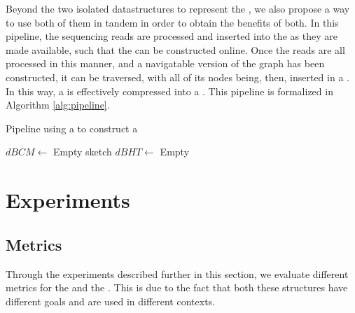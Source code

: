 Beyond the two isolated datastructures to represent the \dBG, we also propose a way to use both of them in tandem in order to obtain
the benefits of both. In this pipeline, the sequencing reads are processed and inserted into the \dBCM as they are made available,
such that the \dBG can be constructed online. Once the reads are all processed in this manner, and a navigatable version of the graph 
has been constructed, it can be traversed, with all of its nodes being, then, inserted in a \dBHT. In this way, a \dBCM is effectively
compressed into a \dBHT. This pipeline is formalized in Algorithm \ref{alg:pipeline}.

\begin{algorithm}
  \caption{Pipeline using a \dBCM to construct a \dBHT}\label{alg:pipeline}
  $\mathit{dBCM} \gets$ Empty \dBCM sketch\;
  $\mathit{dBHT} \gets$ Empty \dBHT\;
\end{algorithm}

\section{Experiments}

\subsection{Metrics}

Through the experiments described further in this section, we evaluate different metrics for the \dBCM and the \dBHT. This is due to
the fact that both these structures have different goals and are used in different contexts.


